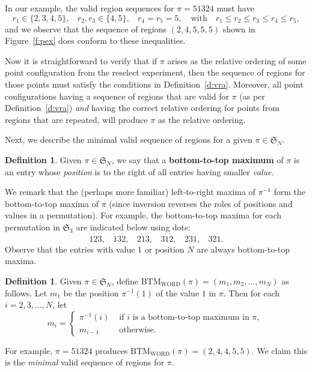 \documentclass[11pt]{amsart}   %
\theoremstyle{definition}
\newtheorem{definition}[theorem]{Definition}
\theoremstyle{remark}
\numberwithin{equation}{section}
\theoremstyle{theorem}
\renewcommand{\S}{\mathcal{S}}
\renewcommand{\S}{\mathfrak{S}}
\newcommand{\BTMW}{\mathrm{BTM_{WORD}}}
\begin{document}
In our example, the valid region sequences for $\pi = 51324$ must have 
\[ r_1 \in \{2, 3, 4, 5\}, \ \ \ \ r_2, r_3 \in \{4, 5\}, \ \ \ \ r_4 = r_5 = 5, \ \ \ \text{ with } \ \ \ r_1 \leq r_2 \leq r_3 \leq r_4 \leq r_5, \]
and we observe that the sequence of regions $(2, 4, 5, 5, 5)$ shown in
Figure~\ref{f:pex} does conform to these inequalities.

Now it is straightforward to verify that if $\pi$ arises as the relative
ordering of some point configuration from the reselect experiment, then the
sequence of regions for those points must satisfy the conditions in
Definition~\ref{d:vra}.  Moreover, all point configurations having a sequence
of regions that are valid for $\pi$ (as per Definition~\ref{d:vra}) {\em and}
having the correct relative ordering for points from regions that are repeated,
will produce $\pi$ as the relative ordering.

Next, we describe the minimal valid sequence of regions for a given $\pi \in \S_N$.

\begin{definition}
Given $\pi \in \S_N$, we say that a {\bf bottom-to-top maximum} of $\pi$ is an entry whose {\em position} is to the right of all entries having smaller {\em value}.
\end{definition}
We remark that the (perhaps more familiar) left-to-right maxima of $\pi^{-1}$ form the bottom-to-top maxima of $\pi$ (since inversion reverses the roles of positions and values in a permutation).  For example, the bottom-to-top maxima for each permutation in $\S_3$ are indicated below using dots:
\[ \dot1\dot2\dot3,\ \ \ \ \dot13\dot2,\ \ \ \ 2\dot1\dot3,\ \ \ \ 3\dot1\dot2,\ \ \ \ 23\dot1,\ \ \ \ 32\dot1.  \]
Observe that the entries with value $1$ or position $N$ are always bottom-to-top maxima.

\begin{definition}\label{d:minvr}
Given $\pi \in \S_N$, define $\BTMW(\pi) = (m_1, m_2, \ldots, m_N)$ as follows.
Let $m_1$ be the position $\pi^{-1}(1)$ of the value $1$ in $\pi$.  Then for each $i = 2, 3, \ldots, N$, let
\[ m_i = \begin{cases}
            \pi^{-1}(i) & \text{ if $i$ is a bottom-to-top maximum in $\pi$, } \\
            m_{i-1} & \text{ otherwise. }
\end{cases} \]
\end{definition}

For example, $\pi = 51324$ produces $\BTMW(\pi) = (2, 4, 4, 5, 5)$.  We claim this is the {\em minimal} valid sequence of regions for $\pi$.
\end{document}
